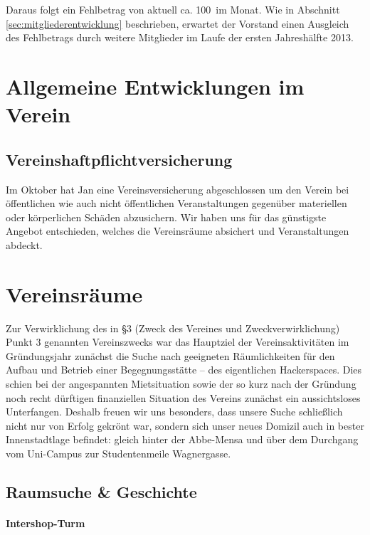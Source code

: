 \documentclass[10pt,DIV16]{scrartcl}
\begin{document}
Daraus folgt ein Fehlbetrag von aktuell ca. 100\EUR\ im Monat. Wie
in Abschnitt \ref{sec:mitgliederentwicklung} beschrieben, erwartet
der Vorstand einen Ausgleich des Fehlbetrags durch weitere Mitglieder
im Laufe der ersten Jahreshälfte 2013.

\section{Allgemeine Entwicklungen im Verein}

\subsection{Vereinshaftpflichtversicherung}

Im Oktober hat Jan eine Vereinsversicherung abgeschlossen um den
Verein bei öffentlichen wie auch nicht öffentlichen Veranstaltungen
gegenüber materiellen oder körperlichen Schäden abzusichern. Wir
haben uns für das günstigste Angebot entschieden, welches die
Vereinsräume absichert und Veranstaltungen abdeckt.


\section{Vereinsräume}

Zur Verwirklichung des in §3 (Zweck des Vereines und Zweckverwirklichung)
Punkt 3 genannten Vereinszwecks war das Hauptziel der Vereinsaktivitäten im
Gründungsjahr zunächst die Suche nach geeigneten Räumlichkeiten für den Aufbau
und Betrieb einer Begegnungsstätte -- des eigentlichen Hackerspaces.  Dies
schien bei der angespannten Mietsituation sowie der so kurz nach der Gründung
noch recht dürftigen finanziellen Situation des Vereins zunächst ein
aussichtsloses Unterfangen.  Deshalb freuen wir uns besonders, dass unsere
Suche schließlich nicht nur von Erfolg gekrönt war, sondern sich unser neues
Domizil auch in bester Innenstadtlage befindet:  gleich hinter der Abbe-Mensa
und über dem Durchgang vom Uni-Campus zur Studentenmeile Wagnergasse.

\subsection{Raumsuche \& Geschichte}

\paragraph{Intershop-Turm}
\end{document}
